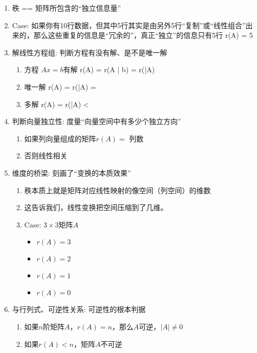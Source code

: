 \documentclass[a4paper,12pt]{article}
\begin{document}
\begin{enumerate}
\begin{enumerate}
            \item 秩 == 矩阵所包含的“独立信息量”
            \item Case: 如果你有10行数据，但其中5行其实是由另外5行“复制”或“线性组合”出来的，那么这些重复的信息是“冗余的”，真正“独立”的信息只有5行 \Rightarrow r(A) = 5
            \item 解线性方程组: 判断方程有没有解、是不是唯一解
            \begin{enumerate}
                \item 方程 $Ax = b$有解 \Leftrightarrow r(A) = r(A | b) = r(\bar{A})
                \item 唯一解 \Leftrightarrow r(A) = r(\bar{A}) = 
                \item 多解 \Leftrightarrow r(A) = r(\bar{A}) < 
            \end{enumerate}
            \item 判断向量独立性: 度量“向量空间中有多少个独立方向”
            \begin{enumerate}
                \item 如果列向量组成的矩阵$r(A) =$ 列数 \Rightarrow {}
                \item 否则线性相关
            \end{enumerate}
            \item 维度的桥梁: 刻画了“变换的本质效果”
            \begin{enumerate}
                \item 秩本质上就是矩阵对应线性映射的像空间（列空间）的维数
                \item 这告诉我们，线性变换把空间压缩到了几维。
                \item Case: $3 \times 3$矩阵$A$
                \begin{itemize}
                    \item $r(A) = 3$ \Rightarrow {}
                    \item $r(A) = 2$ \Rightarrow {}
                    \item $r(A) = 1$ \Rightarrow {}
                    \item $r(A) = 0$ \Rightarrow {}
                \end{itemize}
            \end{enumerate}
            \item 与行列式、可逆性关系: 可逆性的根本判据
            \begin{enumerate}
                \item 如果$n$阶矩阵$A$，$r(A) = n$，那么$A$可逆，$|A| \neq 0$
                \item 如果$r(A) < n$，矩阵$A$不可逆
            \end{enumerate}
        \end{enumerate}
    \end{enumerate}
\end{document}
